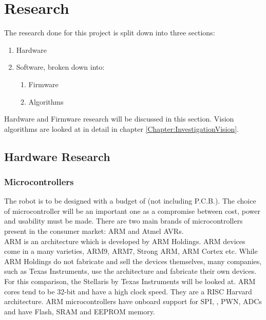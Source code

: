 \chapter{Research} \label{Chapter:Research}
The research done for this project is split down into three sections:
\begin{enumerate}
\item Hardware
\item Software, broken down into:
\begin{enumerate}
\item Firmware
\item Algorithms
\end{enumerate}
\end{enumerate}

Hardware and Firmware research will be discussed in this section. Vision algorithms are looked at in detail in chapter \ref{Chapter:InvestigationVision}.
\section{Hardware Research}
\subsection{Microcontrollers}
The robot is to be designed with a budget of  (not including P.C.B.). The choice of microcontroller will be an important one as a compromise between cost, power and usability must be made. There are two main brands of microcontrollers present in the consumer market: ARM and Atmel AVRs.\\ %
ARM is an architecture which is developed by ARM Holdings. ARM devices come in a many varieties, ARM9, ARM7, Strong ARM, ARM Cortex etc. While ARM Holdings do not fabricate and sell the devices themselves, many companies, such as Texas Instruments, use the architecture and fabricate their own devices. For this comparison, the Stellaris by Texas Instruments will be looked at. ARM cores tend to be 32-bit and have a high clock speed. They are a RISC Harvard architecture. ARM microcontrollers have onboard support for SPI, \itc, PWN, ADCs and have Flash, SRAM and EEPROM memory. 

